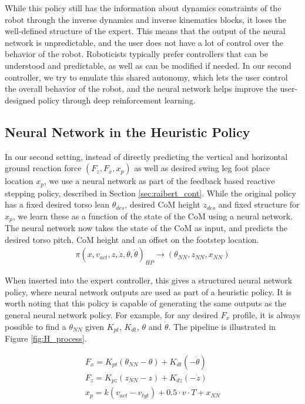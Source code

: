 While this policy still has the information about dynamics constraints of the robot through the inverse dynamics and inverse kinematics blocks, it loses the well-defined structure of the expert. This means that the output of the neural network is unpredictable, and the user does not have a lot of control over the behavior of the robot. Roboticists typically prefer controllers that can be understood and predictable, as well as can be modified if needed. In our second controller, we try to emulate this shared autonomy, which lets the user control the overall behavior of the robot, and the neural network helps improve the user-designed policy through deep reinforcement learning.

\subsection{Neural Network in the Heuristic Policy}\label{NN_HP}

In our second setting, instead of directly predicting the vertical and horizontal ground reaction force $ (F_z, F_x,x_p)$ as well as desired swing leg foot place location $x_p$, we use a neural network as part of the feedback based reactive stepping policy, described in Section \ref{sec:raibert_cont}. 
While the original policy has a fixed desired torso lean $\theta_{des}$, desired CoM height $z_{des}$ and fixed structure for $x_p$, we learn these as a function of the state of the CoM using a neural network. The neural network now takes the state of the CoM as input, and predicts the desired torso pitch, CoM height and an offset on the footstep location.
\begin{align}
  \pi(x,v_{act},z,\dot{z},\theta,\dot{\theta})_{HP} \rightarrow  (\theta_{NN}, z_{NN},x_{NN}) 
\end{align}

When inserted into the expert controller, this gives a structured neural network policy, where neural network outputs are used as part of a heuristic policy. It is worth noting that this policy is capable of generating the same outputs as the general neural network policy. For example, for any desired $F_{x}$ profile, it is always possible to find a $\theta_{NN}$ given $K_{pt}$, $K_{dt}$, $\theta$ and $\dot{\theta}$. The pipeline is illustrated in Figure \ref{fig:H_process}.

\begin{align}
F_x = K_{pt}(\theta_{NN} - \theta) + K_{dt}(-\dot{\theta}) \\
F_z = K_{pz}(z_{NN}-z) + K_{dz}( - \dot{z}) \\
x_p=k(v_{act}-v_{tgt}) + 0.5 \cdot v \cdot T + x_{NN}\label{x_p eq}
\end{align}


